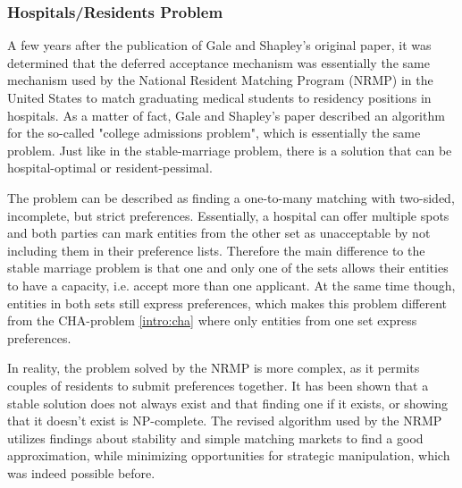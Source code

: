 \subsubsection{Hospitals/Residents Problem}\label{intro:hospital-residents}
A few years after the publication of Gale and Shapley's original paper, it was determined that the deferred acceptance mechanism was essentially the same mechanism used by the National Resident Matching Program (NRMP) in the United States to match graduating medical students to residency positions in hospitals.\cite{Gusfield} As a matter of fact, Gale and Shapley's paper described an algorithm for the so-called "college admissions problem"\cite{GaleShapleyOrig}, which is essentially the same problem. Just like in the stable-marriage problem, there is a solution that can be hospital-optimal or resident-pessimal. 

The problem can be described as finding a one-to-many matching with two-sided, incomplete, but strict preferences. Essentially, a hospital can offer multiple spots and both parties can mark entities from the other set as unacceptable by not including them in their preference lists.\cite{RePEc:ris:nobelp:2012_005} Therefore the main difference to the stable marriage problem is that one and only one of the sets allows their entities to have a capacity, i.e. accept more than one applicant. At the same time though, entities in both sets still express preferences, which makes this problem different from the CHA-problem \ref{intro:cha} where only entities from one set express preferences.

In reality, the problem solved by the NRMP is more complex, as it permits couples of residents to submit preferences together. It has been shown that a stable solution does not always exist and that finding one if it exists, or showing that it doesn't exist is NP-complete.\cite{RONN1990285} The revised algorithm used by the NRMP utilizes findings about stability and simple matching markets to find a good approximation, while minimizing opportunities for strategic manipulation, which was indeed possible before.\cite{NBERw6963}

